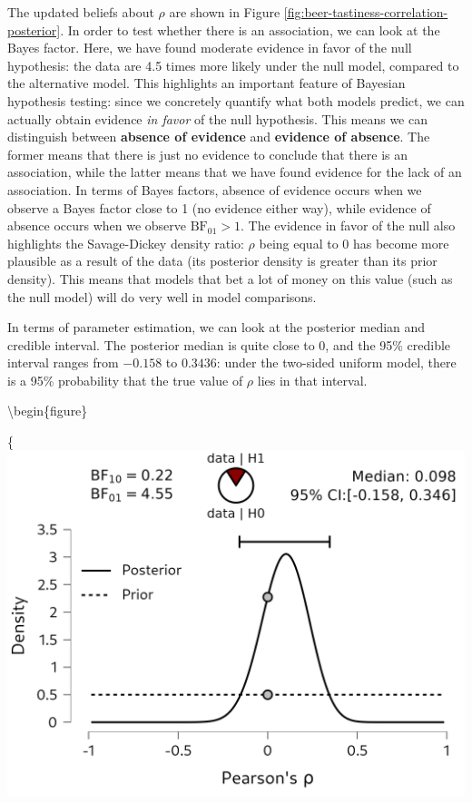\documentclass[
]{book}
\begin{document}
The updated beliefs about \(\rho\) are shown in Figure \ref{fig:beer-tastiness-correlation-posterior}. In order to test whether there is an association, we can look at the Bayes factor. Here, we have found moderate evidence in favor of the null hypothesis: the data are 4.5 times more likely under the null model, compared to the alternative model. This highlights an important feature of Bayesian hypothesis testing: since we concretely quantify what both models predict, we can actually obtain evidence \emph{in favor} of the null hypothesis. This means we can distinguish between \textbf{absence of evidence} and \textbf{evidence of absence}. The former means that there is just no evidence to conclude that there is an association, while the latter means that we have found evidence for the lack of an association. In terms of Bayes factors, absence of evidence occurs when we observe a Bayes factor close to 1 (no evidence either way), while evidence of absence occurs when we observe \(\text{BF}_{01} > 1\).
The evidence in favor of the null also highlights the Savage-Dickey density ratio: \(\rho\) being equal to 0 has become more plausible as a result of the data (its posterior density is greater than its prior density). This means that models that bet a lot of money on this value (such as the null model) will do very well in model comparisons.

In terms of parameter estimation, we can look at the posterior median and credible interval. The posterior median is quite close to 0, and the 95\% credible interval ranges from \(-0.158\) to \(0.3436\): under the two-sided uniform model, there is a 95\% probability that the true value of \(\rho\) lies in that interval.

\textbackslash begin\{figure\}

\{\centering \includegraphics[width=1\linewidth]{Figures/CorrelationTestPosterior}
\end{document}
